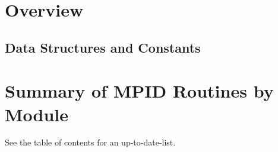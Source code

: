 \documentclass{article}
\begin{document}
\mancontentstrue

\section{Overview}



\subsection{Data Structures and Constants}

%


\section{Summary of MPID Routines by Module}

See the table of contents for an up-to-date-list.



\end{document}
